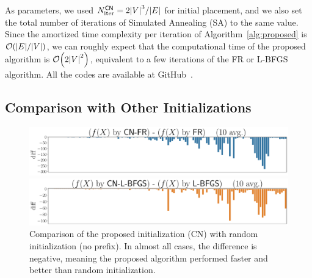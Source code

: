 \documentclass[dvipdfmx,10pt,journal,compsoc]{IEEEtran}
\begin{document}
As parameters, we used $N_\mathrm{iter}^\mathsf{CN} = 2 \abs{V}^3 / \abs{E}$ for initial placement, and we also set the total number of iterations of Simulated Annealing (\textsf{SA}) to the same value.
Since the amortized time complexity per iteration of Algorithm~\ref{alg:proposed} is $\order{\abs{E} / \abs{V}}$, we can roughly expect that the computational time of the proposed algorithm is $\order{2\abs{V}^2}$, equivalent to a few iterations of the FR or L-BFGS algorithm.
All the codes are available at GitHub~\cite{ThisPaperGitHub}.

\subsection{Comparison with Other Initializations}\label{ssec:exprAll}

\begin{figure}[t]
  \centering
  \begin{minipage}{\columnwidth}
    \centering
    \includegraphics[width=\columnwidth]{overall/plot/diff_FR_50.pdf}
  \end{minipage}
  \begin{minipage}{\columnwidth}
    \centering
    \includegraphics[width=\columnwidth]{overall/plot/diff_L-BFGS_50.pdf}
  \end{minipage}
  \caption{
    Comparison of the proposed initialization (\textsf{CN}) with random initialization (no prefix).
    In almost all cases, the difference is negative, meaning the proposed algorithm performed faster and better than random initialization.
  }
  \label{fig:overall}
\end{figure}
\end{document}
